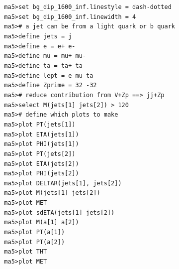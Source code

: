 \documentclass[a4paper, 10pt]{article}
\begin{document}
\texttt{ }\texttt{ }\texttt{ma5>set bg\_dip\_1600\_inf.linestyle = dash-dotted\\
}
\texttt{ }\texttt{ }\texttt{ma5>set bg\_dip\_1600\_inf.linewidth = 4\\
}
\texttt{ }\texttt{ }\texttt{ma5>\# a jet can be from a light quark or b quark\\
}
\texttt{ }\texttt{ }\texttt{ma5>define jets = j\\
}
\texttt{ }\texttt{ }\texttt{ma5>define e = e+ e-\\
}
\texttt{ }\texttt{ }\texttt{ma5>define mu = mu+ mu-\\
}
\texttt{ }\texttt{ }\texttt{ma5>define ta = ta+ ta-\\
}
\texttt{ }\texttt{ }\texttt{ma5>define lept = e mu ta\\
}
\texttt{ }\texttt{ }\texttt{ma5>define Zprime = 32 -32\\
}
\texttt{ }\texttt{ }\texttt{ma5>\# reduce contribution from V+Zp ==> jj+Zp\\
}
\texttt{ }\texttt{ }\texttt{ma5>select M(jets[1] jets[2]) > 120\\
}
\texttt{ }\texttt{ }\texttt{ma5>\# define which plots to make\\
}
\texttt{ }\texttt{ }\texttt{ma5>plot PT(jets[1])\\
}
\texttt{ }\texttt{ }\texttt{ma5>plot ETA(jets[1])\\
}
\texttt{ }\texttt{ }\texttt{ma5>plot PHI(jets[1])\\
}
\texttt{ }\texttt{ }\texttt{ma5>plot PT(jets[2])\\
}
\texttt{ }\texttt{ }\texttt{ma5>plot ETA(jets[2])\\
}
\texttt{ }\texttt{ }\texttt{ma5>plot PHI(jets[2])\\
}
\texttt{ }\texttt{ }\texttt{ma5>plot DELTAR(jets[1], jets[2])\\
}
\texttt{ }\texttt{ }\texttt{ma5>plot M(jets[1] jets[2])\\
}
\texttt{ }\texttt{ }\texttt{ma5>plot MET\\
}
\texttt{ }\texttt{ }\texttt{ma5>plot sdETA(jets[1] jets[2])\\
}
\texttt{ }\texttt{ }\texttt{ma5>plot M(a[1] a[2])\\
}
\texttt{ }\texttt{ }\texttt{ma5>plot PT(a[1])\\
}
\texttt{ }\texttt{ }\texttt{ma5>plot PT(a[2])\\
}
\texttt{ }\texttt{ }\texttt{ma5>plot THT\\
}
\texttt{ }\texttt{ }\texttt{ma5>plot MET\\
}
\end{document}
